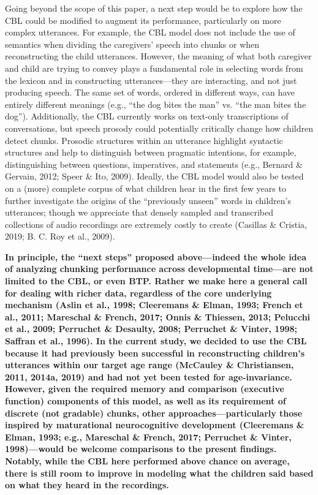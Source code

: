 \documentclass[man,mask,floatsintext]{apa6}
\begin{document}
Going beyond the scope of this paper, a next step would be to explore
how the CBL could be modified to augment its performance, particularly
on more complex utterances. For example, the CBL model does not include
the use of semantics when dividing the caregivers' speech into chunks or
when reconstructing the child utterances. However, the meaning of what
both caregiver and child are trying to convey plays a fundamental role
in selecting words from the lexicon and in constructing
utterances---they are interacting, and not just producing speech. The
same set of words, ordered in different ways, can have entirely
different meanings (e.g., \enquote{the dog bites the man} vs.
\enquote{the man bites the dog}). Additionally, the CBL currently works
on text-only transcriptions of conversations, but speech prosody could
potentially critically change how children detect chunks. Prosodic
structures within an utterance highlight syntactic structures and help
to distinguish between pragmatic intentions, for example, distinguishing
between questions, imperatives, and statements (e.g., Bernard \&
Gervain, 2012; Speer \& Ito, 2009). Ideally, the CBL model would also be
tested on a (more) complete corpus of what children hear in the first
few years to further investigate the origins of the \enquote{previously
unseen} words in children's utterances; though we appreciate that
densely sampled and transcribed collections of audio recordings are
extremely costly to create (Casillas \& Cristia, 2019; B. C. Roy et al.,
2009).

\textbf{In principle, the \enquote{next steps} proposed above---indeed
the whole idea of analyzing chunking performance across developmental
time---are not limited to the CBL, or even BTP. Rather we make here a
general call for dealing with richer data, regardless of the core
underlying mechanism (Aslin et al., 1998; Cleeremans \& Elman, 1993;
French et al., 2011; Mareschal \& French, 2017; Onnis \& Thiessen, 2013;
Pelucchi et al., 2009; Perruchet \& Desaulty, 2008; Perruchet \& Vinter,
1998; Saffran et al., 1996). In the current study, we decided to use the
CBL because it had previously been successful in reconstructing
children's utterances within our target age range (McCauley \&
Christiansen, 2011, 2014a, 2019) and had not yet been tested for
age-invariance. However, given the required memory and comparison
(executive function) components of this model, as well as its
requirement of discrete (not gradable) chunks, other
approaches---particularly those inspired by maturational neurocognitive
development (Cleeremans \& Elman, 1993; e.g., Mareschal \& French, 2017;
Perruchet \& Vinter, 1998)---would be welcome comparisons to the present
findings. Notably, while the CBL here performed above chance on average,
there is still room to improve in modeling what the children said based
on what they heard in the recordings.}
\end{document}
